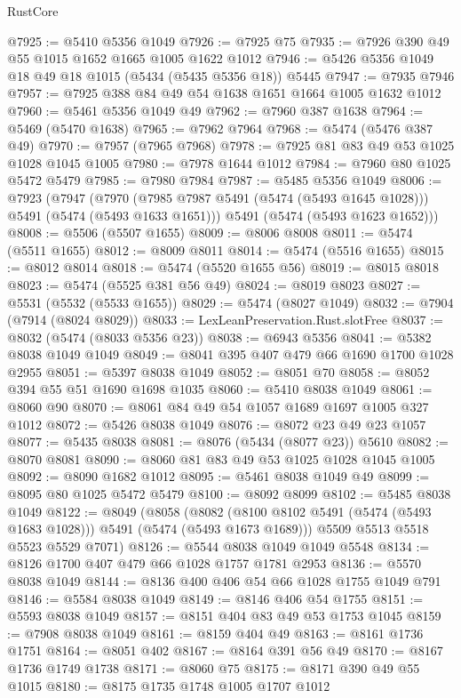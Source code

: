 \begin{lexlean}{RustCore}
\begin{coremodule}
@7925 := @5410 @5356 @1049
@7926 := @7925 @75
@7935 := @7926 @390 @49 @55 @1015 @1652 @1665 @1005 @1622 @1012
@7946 := @5426 @5356 @1049 @18 @49 @18 @1015 (@5434 (@5435 @5356 @18)) @5445
@7947 := @7935 @7946
@7957 := @7925 @388 @84 @49 @54 @1638 @1651 @1664 @1005 @1632 @1012
@7960 := @5461 @5356 @1049 @49
@7962 := @7960 @387 @1638
@7964 := @5469 (@5470 @1638)
@7965 := @7962 @7964
@7968 := @5474 (@5476 @387 @49)
@7970 := @7957 (@7965 @7968)
@7978 := @7925 @81 @83 @49 @53 @1025 @1028 @1045 @1005
@7980 := @7978 @1644 @1012
@7984 := @7960 @80 @1025 @5472 @5479
@7985 := @7980 @7984
@7987 := @5485 @5356 @1049
@8006 := @7923
    (@7947
      (@7970 (@7985 @7987 @5491 (@5474 (@5493 @1645 @1028))) @5491 (@5474 (@5493 @1633 @1651)))
      @5491
      (@5474 (@5493 @1623 @1652)))
@8008 := @5506 (@5507 @1655)
@8009 := @8006 @8008
@8011 := @5474 (@5511 @1655)
@8012 := @8009 @8011
@8014 := @5474 (@5516 @1655)
@8015 := @8012 @8014
@8018 := @5474 (@5520 @1655 @56)
@8019 := @8015 @8018
@8023 := @5474 (@5525 @381 @56 @49)
@8024 := @8019 @8023
@8027 := @5531 (@5532 (@5533 @1655))
@8029 := @5474 (@8027 @1049)
@8032 := @7904 (@7914 (@8024 @8029))
@8033 := LexLeanPreservation.Rust.slotFree
@8037 := @8032 (@5474 (@8033 @5356 @23))
@8038 := @6943 @5356
@8041 := @5382 @8038 @1049 @1049
@8049 := @8041 @395 @407 @479 @66 @1690 @1700 @1028 @2955
@8051 := @5397 @8038 @1049
@8052 := @8051 @70
@8058 := @8052 @394 @55 @51 @1690 @1698 @1035
@8060 := @5410 @8038 @1049
@8061 := @8060 @90
@8070 := @8061 @84 @49 @54 @1057 @1689 @1697 @1005 @327 @1012
@8072 := @5426 @8038 @1049
@8076 := @8072 @23 @49 @23 @1057
@8077 := @5435 @8038
@8081 := @8076 (@5434 (@8077 @23)) @5610
@8082 := @8070 @8081
@8090 := @8060 @81 @83 @49 @53 @1025 @1028 @1045 @1005
@8092 := @8090 @1682 @1012
@8095 := @5461 @8038 @1049 @49
@8099 := @8095 @80 @1025 @5472 @5479
@8100 := @8092 @8099
@8102 := @5485 @8038 @1049
@8122 := @8049
    (@8058
      (@8082 (@8100 @8102 @5491 (@5474 (@5493 @1683 @1028))) @5491 (@5474 (@5493 @1673 @1689)))
      @5509
      @5513
      @5518
      @5523
      @5529
      @7071)
@8126 := @5544 @8038 @1049 @1049 @5548
@8134 := @8126 @1700 @407 @479 @66 @1028 @1757 @1781 @2953
@8136 := @5570 @8038 @1049
@8144 := @8136 @400 @406 @54 @66 @1028 @1755 @1049 @791
@8146 := @5584 @8038 @1049
@8149 := @8146 @406 @54 @1755
@8151 := @5593 @8038 @1049
@8157 := @8151 @404 @83 @49 @53 @1753 @1045
@8159 := @7908 @8038 @1049
@8161 := @8159 @404 @49
@8163 := @8161 @1736 @1751
@8164 := @8051 @402
@8167 := @8164 @391 @56 @49
@8170 := @8167 @1736 @1749 @1738
@8171 := @8060 @75
@8175 := @8171 @390 @49 @55 @1015
@8180 := @8175 @1735 @1748 @1005 @1707 @1012

\end{coremodule}
\end{lexlean}
